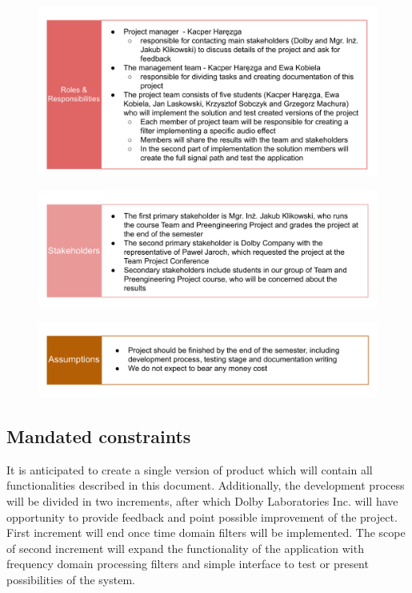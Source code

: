 \documentclass[12pt]{article}
\begin{document}
	\begin{figure}[H]
		\includegraphics[width=1\textwidth, center]{Roles & Responsibilities (1)}
	\end{figure}
	
	\begin{figure}[H]
		\includegraphics[width=1\textwidth, center]{Stakeholders}
	\end{figure}
	
	\begin{figure}[H]
		\includegraphics[width=1\textwidth, center]{Assumptions}
	\end{figure}

\subsection{Mandated constraints}

It is anticipated to create a single version of product which will contain all functionalities described in this document. Additionally, the development process will be divided in two increments, after which Dolby Laboratories Inc. will have opportunity to provide feedback and point possible improvement of the project. First increment will end once time domain filters will be implemented. The scope of second increment will expand the functionality of the application with frequency domain processing filters and simple interface to test or present possibilities of the system.
\end{document}
